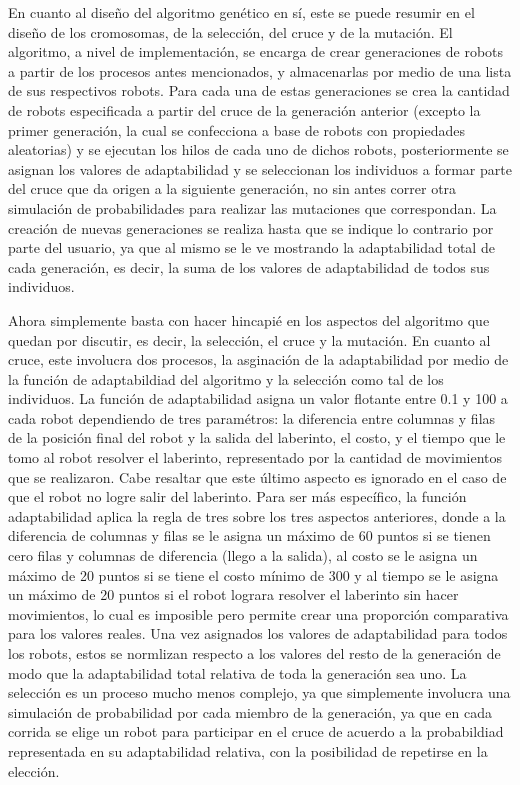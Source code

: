 \documentclass[conference]{IEEEtran}
\begin{document}
En cuanto al diseño del algoritmo genético en sí, este se puede resumir en el diseño de los cromosomas, de la selección, del cruce y de la mutación. El algoritmo, a nivel de implementación, se encarga de crear generaciones de robots a partir de los procesos antes mencionados, y almacenarlas por medio de una lista de sus respectivos robots. Para cada una de estas generaciones se crea la cantidad de robots especificada a partir del cruce de la generación anterior (excepto la primer generación, la cual se confecciona a base de robots con propiedades aleatorias) y se ejecutan los hilos de cada uno de dichos robots, posteriormente se asignan los valores de adaptabilidad y se seleccionan los individuos a formar parte del cruce que da origen a la siguiente generación, no sin antes correr otra simulación de probabilidades para realizar las mutaciones que correspondan. La creación de nuevas generaciones se realiza hasta que se indique lo contrario por parte del usuario, ya que al mismo se le ve mostrando la adaptabilidad total de cada generación, es decir, la suma de los valores de adaptabilidad de todos sus individuos.

Ahora simplemente basta con hacer hincapié en los aspectos del algoritmo que quedan por discutir, es decir, la selección, el cruce y la mutación. En cuanto al cruce, este involucra dos procesos, la asginación de la adaptabilidad por medio de la función de adaptabildiad del algoritmo y la selección como tal de los individuos. La función de adaptabilidad asigna un valor flotante entre 0.1 y 100 a cada robot dependiendo de tres paramétros: la diferencia entre columnas y filas de la posición final del robot y la salida del laberinto, el costo, y el tiempo que le tomo al robot resolver el laberinto, representado por la cantidad de movimientos que se realizaron. Cabe resaltar que este último aspecto es ignorado en el caso de que el robot no logre salir del laberinto. Para ser más específico, la función adaptabilidad aplica la regla de tres sobre los tres aspectos anteriores, donde a la diferencia de columnas y filas se le asigna un máximo de 60 puntos si se tienen cero filas y columnas de diferencia (llego a la salida), al costo se le asigna un máximo de 20 puntos si se tiene el costo mínimo de 300 y al tiempo se le asigna un máximo de 20 puntos si el robot lograra resolver el laberinto sin hacer movimientos, lo cual es imposible pero permite crear una proporción comparativa para los valores reales. Una vez asignados los valores de adaptabilidad para todos los robots, estos se normlizan respecto a los valores del resto de la generación de modo que la adaptabilidad total relativa de toda la generación sea uno. La selección es un proceso mucho menos complejo, ya que simplemente involucra una simulación de probabilidad por cada miembro de la generación, ya que en cada corrida se elige un robot para participar en el cruce de acuerdo a la probabildiad representada en su adaptabilidad relativa, con la posibilidad de repetirse en la elección.
\end{document}
